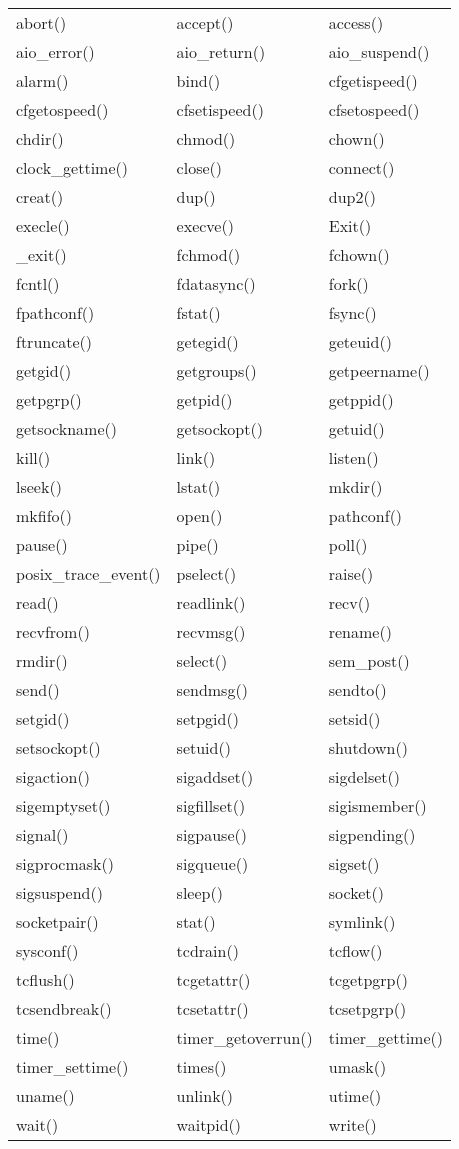 \begin{tabular}{l l l}
abort() & accept() & access()\\
aio\_error() & aio\_return() & aio\_suspend()\\
alarm() & bind() & cfgetispeed()\\
cfgetospeed() & cfsetispeed() & cfsetospeed()\\
chdir() & chmod() & chown()\\
clock\_gettime() & close() & connect()\\
creat() & dup() & dup2()\\
execle() & execve() & Exit()\\
\_exit() & fchmod() & fchown()\\
fcntl() & fdatasync() & fork()\\
fpathconf() & fstat() & fsync()\\
ftruncate() & getegid() & geteuid()\\
getgid() & getgroups() & getpeername()\\
getpgrp() & getpid() & getppid()\\
getsockname() & getsockopt() & getuid()\\
kill() & link() & listen()\\
lseek() & lstat() & mkdir()\\
mkfifo() & open() & pathconf()\\
pause() & pipe() & poll()\\
posix\_trace\_event() & pselect() & raise()\\
read() & readlink() & recv()\\
recvfrom() & recvmsg() & rename()\\
rmdir() & select() & sem\_post()\\
send() & sendmsg() & sendto()\\
setgid() & setpgid() & setsid()\\
setsockopt() & setuid() & shutdown()\\
sigaction() & sigaddset() & sigdelset()\\
sigemptyset() & sigfillset() & sigismember()\\
signal() & sigpause() & sigpending()\\
sigprocmask() & sigqueue() & sigset()\\
sigsuspend() & sleep() & socket()\\
socketpair() & stat() & symlink()\\
sysconf() & tcdrain() & tcflow()\\
tcflush() & tcgetattr() & tcgetpgrp()\\
tcsendbreak() & tcsetattr() & tcsetpgrp()\\
time() & timer\_getoverrun() & timer\_gettime()\\
timer\_settime() & times() & umask()\\
uname() & unlink() & utime()\\
wait() & waitpid() & write()\\
\end{tabular}

